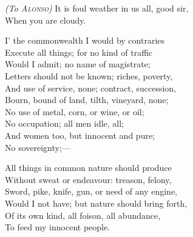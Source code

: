 \begin{verse_speech}[Gonzalo] 
\textit{(To \textsc{Alonso})} It is foul weather in us all, good sir, \\
When you are cloudy.
\end{verse_speech}

\begin{verse_speech}[Gonzalo] 
I' the commonwealth I would by contraries\\
Execute all things; for no kind of traffic\\
Would I admit; no name of magistrate;\\
Letters should not be known; riches, poverty,\\
And use of service, none; contract, succession,\\
Bourn, bound of land, tilth, vineyard, none;\\
No use of metal, corn, or wine, or oil;\\
No occupation; all men idle, all;\\
And women too, but innocent and pure;\\
No sovereignty;—
\end{verse_speech}

\begin{verse_speech}[Gonzalo] 
All things in common nature should produce\\
Without sweat or endeavour: treason, felony,\\
Sword, pike, knife, gun, or need of any engine,\\
Would I not have; but nature should bring forth,\\
Of its own kind, all foison, all abundance,\\
To feed my innocent people.
\end{verse_speech}

